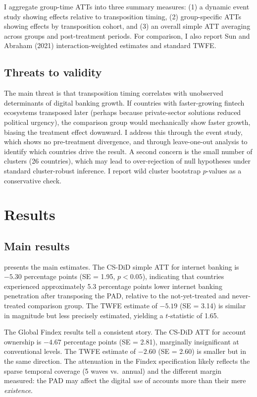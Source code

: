 \documentclass[12pt]{article}
\begin{document}
I aggregate group-time ATTs into three summary measures: (1) a dynamic event study showing effects relative to transposition timing, (2) group-specific ATTs showing effects by transposition cohort, and (3) an overall simple ATT averaging across groups and post-treatment periods. For comparison, I also report Sun and Abraham (2021) interaction-weighted estimates and standard TWFE.

\subsection{Threats to validity}

The main threat is that transposition timing correlates with unobserved determinants of digital banking growth. If countries with faster-growing fintech ecosystems transposed later (perhaps because private-sector solutions reduced political urgency), the comparison group would mechanically show faster growth, biasing the treatment effect downward. I address this through the event study, which shows no pre-treatment divergence, and through leave-one-out analysis to identify which countries drive the result. A second concern is the small number of clusters (26 countries), which may lead to over-rejection of null hypotheses under standard cluster-robust inference. I report wild cluster bootstrap $p$-values as a conservative check.


\section{Results}
\label{sec:results}

\subsection{Main results}

 presents the main estimates. The CS-DiD simple ATT for internet banking is $-5.30$ percentage points (SE = 1.95, $p < 0.05$), indicating that countries experienced approximately 5.3 percentage points lower internet banking penetration after transposing the PAD, relative to the not-yet-treated and never-treated comparison group. The TWFE estimate of $-5.19$ (SE = 3.14) is similar in magnitude but less precisely estimated, yielding a $t$-statistic of 1.65.



The Global Findex results tell a consistent story. The CS-DiD ATT for account ownership is $-4.67$ percentage points (SE = 2.81), marginally insignificant at conventional levels. The TWFE estimate of $-2.60$ (SE = 2.60) is smaller but in the same direction. The attenuation in the Findex specification likely reflects the sparse temporal coverage (5 waves vs.\ annual) and the different margin measured: the PAD may affect the digital \emph{use} of accounts more than their mere \emph{existence}.
\end{document}
